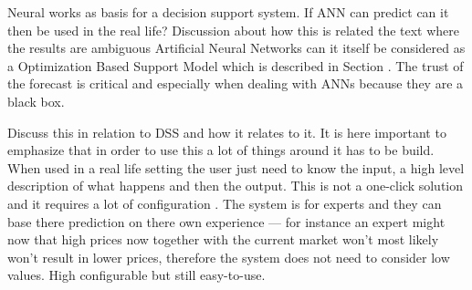 Neural works as basis for a decision support system. If ANN can predict can it then be used in the real life? Discussion about how this is related the text where the results are ambiguous 
Artificial Neural Networks can it itself be considered as a Optimization Based Support Model which is described in Section . The trust of the forecast is critical and especially when dealing with ANNs because they are a black box. 

Discuss this in relation to DSS and how it relates to it. It is here important to emphasize that in order to use this a lot of things around it has to be build. When used in a real life setting the user just need to know the input, a high level description of what happens and then the output.
This is not a one-click solution and it requires a lot of configuration . The system is for experts and they can base there prediction on there own experience --- for instance an expert might now that high prices now together with the current market won't most likely won't result in lower prices, therefore the system does not need to consider low values. High configurable but still easy-to-use.

